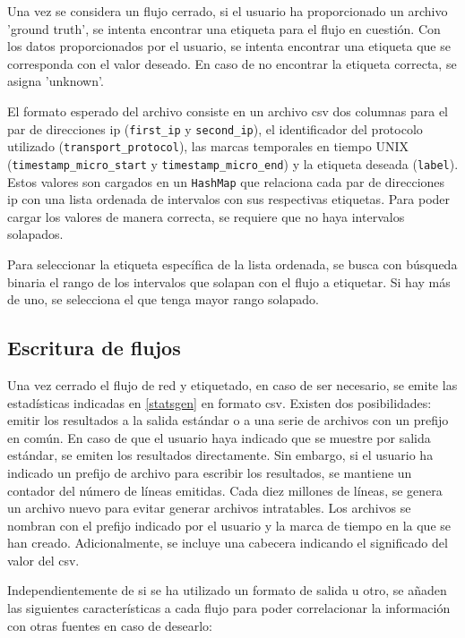 Una vez se considera un flujo cerrado, si el usuario ha proporcionado un archivo 'ground truth', se intenta encontrar una etiqueta para el flujo en cuestión. Con los datos proporcionados por el usuario, se intenta encontrar una etiqueta que se corresponda con el valor deseado. En caso de no encontrar la etiqueta correcta, se asigna 'unknown'.

El formato esperado del archivo consiste en un archivo \acrshort{csv} dos columnas para el par de direcciones \acrshort{ip} (\texttt{first\_\-ip} y \texttt{second\_\-ip}), el identificador del protocolo utilizado (\texttt{transport\_\-protocol}), las marcas temporales en tiempo UNIX (\texttt{timestamp\_\-micro\_\-start} y \texttt{timestamp\_\-micro\_\-end}) y la etiqueta deseada (\texttt{label}). Estos valores son cargados en un \texttt{HashMap} que relaciona cada par de direcciones \acrshort{ip} con una lista ordenada de intervalos con sus respectivas etiquetas. Para poder cargar los valores de manera correcta, se requiere que no haya intervalos solapados.

Para seleccionar la etiqueta específica de la lista ordenada, se busca con búsqueda binaria el rango de los intervalos que solapan con el flujo a etiquetar. Si hay más de uno, se selecciona el que tenga mayor rango solapado.

\subsection{Escritura de flujos} \label{flowwrite}

Una vez cerrado el flujo de red y etiquetado, en caso de ser necesario, se emite las estadísticas indicadas en \ref{statsgen} en formato \acrshort{csv}. Existen dos posibilidades: emitir los resultados a la salida estándar o a una serie de archivos con un prefijo en común. En caso de que el usuario haya indicado que se muestre por salida estándar, se emiten los resultados directamente. Sin embargo, si el usuario ha indicado un prefijo de archivo para escribir los resultados, se mantiene un contador del número de líneas emitidas. Cada diez millones de líneas, se genera un archivo nuevo para evitar generar archivos intratables. Los archivos se nombran con el prefijo indicado por el usuario y la marca de tiempo en la que se han creado. Adicionalmente, se incluye una cabecera indicando el significado del valor del \acrshort{csv}.

Independientemente de si se ha utilizado un formato de salida u otro, se añaden las siguientes características a cada flujo para poder correlacionar la información con otras fuentes en caso de desearlo:

